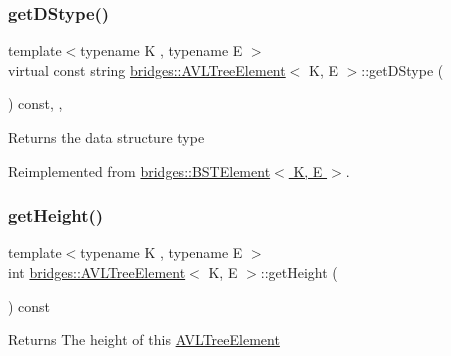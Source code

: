 \subsubsection{\texorpdfstring{get\+D\+Stype()}{getDStype()}}
{\footnotesize\ttfamily template$<$typename K , typename E $>$ \\
virtual const string \hyperlink{classbridges_1_1_a_v_l_tree_element}{bridges\+::\+A\+V\+L\+Tree\+Element}$<$ K, E $>$\+::get\+D\+Stype (\begin{DoxyParamCaption}{ }\end{DoxyParamCaption}) const\hspace{0.3cm}{\ttfamily [inline]}, {\ttfamily [override]}, {\ttfamily [virtual]}}

\begin{DoxyReturn}{Returns}
the data structure type 
\end{DoxyReturn}


Reimplemented from \hyperlink{classbridges_1_1_b_s_t_element_af3843873c508c24f90b6e73a6f490bf8}{bridges\+::\+B\+S\+T\+Element$<$ K, E $>$}.

\hypertarget{classbridges_1_1_a_v_l_tree_element_ace72b436fa14db4f7844cc6e30b87aa7}{}\label{classbridges_1_1_a_v_l_tree_element_ace72b436fa14db4f7844cc6e30b87aa7} 
\subsubsection{\texorpdfstring{get\+Height()}{getHeight()}}
{\footnotesize\ttfamily template$<$typename K , typename E $>$ \\
int \hyperlink{classbridges_1_1_a_v_l_tree_element}{bridges\+::\+A\+V\+L\+Tree\+Element}$<$ K, E $>$\+::get\+Height (\begin{DoxyParamCaption}{ }\end{DoxyParamCaption}) const\hspace{0.3cm}{\ttfamily [inline]}}

\begin{DoxyReturn}{Returns}
The height of this \hyperlink{classbridges_1_1_a_v_l_tree_element}{A\+V\+L\+Tree\+Element} 
\end{DoxyReturn}
\hypertarget{classbridges_1_1_a_v_l_tree_element_a7b5d05660da127f5f6164120d9846d90}{}\label{classbridges_1_1_a_v_l_tree_element_a7b5d05660da127f5f6164120d9846d90} 
